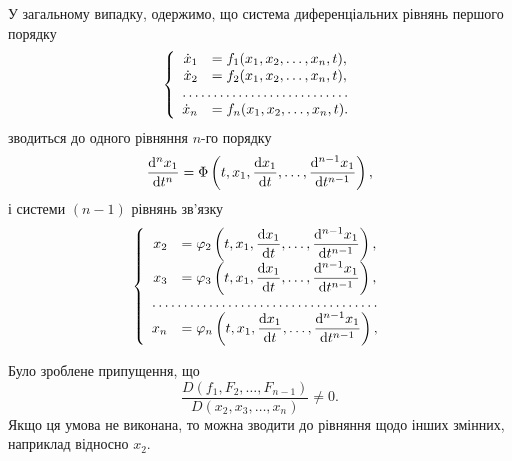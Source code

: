 У загальному випадку, одержимо, що система диференціальних рівнянь першого порядку
\begin{equation*}
	\left\{
		\begin{array}{rl}
			\dot x_1 &= f_1 (x_1, x_2, \ldots, x_n, t), \\
			\dot x_2 &= f_2 (x_1, x_2, \ldots, x_n, t), \\
			\hdotsfor{2} \\
			\dot x_n &= f_n (x_1, x_2, \ldots, x_n, t).
		\end{array}
	\right.
\end{equation*}
зводиться до одного рівняння $n$-го порядку
\begin{equation*}
	\frac{\mathop{}\!\mathrm{d}^n x_1}{\mathop{}\!\mathrm{d} t^n} = \Phi \left( t, x_1, \frac{\mathop{}\!\mathrm{d} x_1}{\mathop{}\!\mathrm{d} t}, \ldots, \frac{\mathop{}\!\mathrm{d}^{n - 1} x_1}{\mathop{}\!\mathrm{d} t^{n - 1}} \right),
\end{equation*}
і системи $(n - 1)$ рівнянь зв'язку
\begin{equation*}
	\left\{
		\begin{array}{rl}
			x_2 &= \phi_2 \left( t, x_1, \dfrac{\diff x_1}{\diff t}, \ldots, \dfrac{\diff^{n - 1} x_1}{\diff t^{n - 1}} \right), \\
			x_3 &= \phi_3 \left( t, x_1, \dfrac{\diff x_1}{\diff t}, \ldots, \dfrac{\diff^{n - 1} x_1}{\diff t^{n - 1}} \right), \\
			\hdotsfor{2} \\
			x_n &= \phi_n \left( t, x_1, \dfrac{\diff x_1}{\diff t}, \ldots, \dfrac{\diff^{n - 1} x_1}{\diff t^{n - 1}} \right), \\
		\end{array}
	\right.
\end{equation*}
 
\begin{remark}
	Було зроблене припущення, що \[\frac{D(f_1, F_2, \ldots, F_{n - 1})}{D(x_2, x_3, \ldots, x_n)} \ne 0.\] Якщо ця умова не виконана, то можна зводити до рівняння щодо інших змінних, наприклад відносно $x_2$.
\end{remark}
